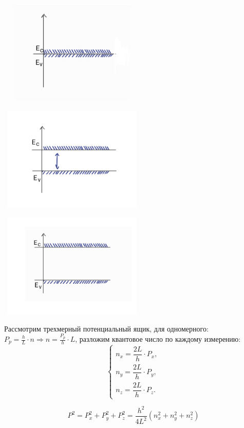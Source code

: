 \documentclass[../main.tex]{subfiles}
\begin{document}
\begin{center}
    \includegraphics[height=5cm, width=7cm]{../img/kvantovy6.png}
\end{center}
\begin{center}
    \includegraphics[height=5cm, width=7cm]{../img/kvantovy7.png}
\end{center}
\begin{center}
    \includegraphics[height=5cm, width=7cm]{../img/kvantovy8.png}
\end{center}
Рассмотрим трехмерный потенциальный ящик, для одномерного: $P_p = \frac{h}{L} \cdot n \Rightarrow n = \frac{P_p}{h} \cdot L$, разложим квантовое число по каждому измерению: 
\[
\begin{cases}
n_x = \dfrac{2L}{h} \cdot P_x,\\[4pt]
n_y = \dfrac{2L}{h} \cdot P_y,\\[4pt]
n_z = \dfrac{2L}{h} \cdot P_z.
\end{cases}
\]


\[P^2 = P^2_x + P^2_y + P^2_z = \frac{h^2}{4L^2}(n_x^2 + n_y^2+n_z^2)\]
\end{document}
